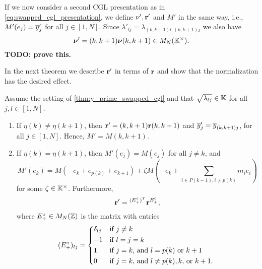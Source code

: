 \medskip

If we now consider a second CGL presentation as in \cref{eq:swapped_cgl_presentation},
we define $\nu', \mathbf{r}'$ and $M'$ in the same way, i.e., $M'(e_j) = \overline{y}'_j$ for all $j
	\in [1, N]$. Since $\lambda'_{lj} = \lambda_{(k, k+1)l, (k, k+1)j}$ we also have
\begin{equation*}
	\boldsymbol{\nu}' = (k, k+1)\boldsymbol{\nu} (k, k+1) \in M_N(\mathbb{K}^\times).
\end{equation*}
\textbf{TODO: prove this.}

In the next theorem we describe $\mathbf{r}'$ in terms of $\mathbf{r}$ and show that the
normalization has the desired effect.

\begin{theorem}\label{thm:almost_mutation_toric_frame}

	Assume the setting of \cref{thm:y_prime_swapped_cgl} and that $\sqrt{\lambda_{lj}}\in
		\mathbb{K}$ for all $j, l \in [1, N]$.
	\begin{enumerate}
		\item If $\eta(k) \neq \eta(k+1)$, then $\mathbf{r}' = (k, k+1)\mathbf{r} (k, k+1)$ and $\overline{y}'_j =
			      \overline{y}_{(k, k+1)j}$, for all $j \in [1, N]$. Hence, $M' = M(k, k+1)$.
		\item If $\eta(k) = \eta(k+1)$, then $M'(e_j) = M(e_j)$ for all $j \neq k$, and
		      \begin{equation}\label{eq:M'_of_ek}
			      M'(e_k) = M(-e_k + e_{p(k)} + e_{k+1}) + \zeta M\left(-e_k + \sum_{i \in P(k-1), i\neq p(k)}m_ie_i\right)
		      \end{equation}
		      for some $\zeta \in \mathbb{K}^\times$. Furthermore,
		      \begin{equation*}
			      \mathbf{r}' = \prescript{(E_{+}^\circ)^T}{}{\mathbf{r}}^{E^\circ_{+}},
		      \end{equation*}
		      where $E^\circ_{+}\in M_N(\mathbb{Z})$ is the matrix with entries
		      \begin{equation*}
			      (E^\circ_{+})_{lj} = \begin{dcases*}
				      \delta_{lj} & if $j \neq k$                               \\
				      -1          & if $l = j = k$                              \\
				      1           & if $j=k$, and $l= p(k)$ or $k+1$            \\
				      0           & if $j = k$, and $l \neq p(k), k,$ or $k+1$.
			      \end{dcases*}
		      \end{equation*}
	\end{enumerate}
\end{theorem}

